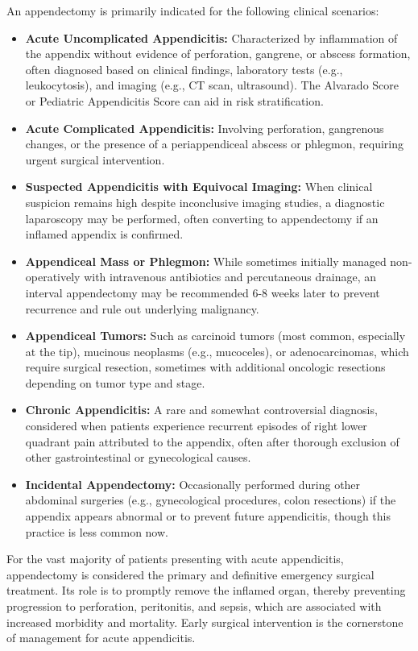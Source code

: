 An appendectomy is primarily indicated for the following clinical scenarios:
\begin{itemize}
  \item \textbf{Acute Uncomplicated Appendicitis:} Characterized by inflammation of the appendix without evidence of perforation, gangrene, or abscess formation, often diagnosed based on clinical findings, laboratory tests (e.g., leukocytosis), and imaging (e.g., CT scan, ultrasound). The Alvarado Score or Pediatric Appendicitis Score can aid in risk stratification.
  \item \textbf{Acute Complicated Appendicitis:} Involving perforation, gangrenous changes, or the presence of a periappendiceal abscess or phlegmon, requiring urgent surgical intervention.
  \item \textbf{Suspected Appendicitis with Equivocal Imaging:} When clinical suspicion remains high despite inconclusive imaging studies, a diagnostic laparoscopy may be performed, often converting to appendectomy if an inflamed appendix is confirmed.
  \item \textbf{Appendiceal Mass or Phlegmon:} While sometimes initially managed non-operatively with intravenous antibiotics and percutaneous drainage, an interval appendectomy may be recommended 6-8 weeks later to prevent recurrence and rule out underlying malignancy.
  \item \textbf{Appendiceal Tumors:} Such as carcinoid tumors (most common, especially at the tip), mucinous neoplasms (e.g., mucoceles), or adenocarcinomas, which require surgical resection, sometimes with additional oncologic resections depending on tumor type and stage.
  \item \textbf{Chronic Appendicitis:} A rare and somewhat controversial diagnosis, considered when patients experience recurrent episodes of right lower quadrant pain attributed to the appendix, often after thorough exclusion of other gastrointestinal or gynecological causes.
  \item \textbf{Incidental Appendectomy:} Occasionally performed during other abdominal surgeries (e.g., gynecological procedures, colon resections) if the appendix appears abnormal or to prevent future appendicitis, though this practice is less common now.
\end{itemize}

For the vast majority of patients presenting with acute appendicitis, appendectomy is considered the primary and definitive emergency surgical treatment. Its role is to promptly remove the inflamed organ, thereby preventing progression to perforation, peritonitis, and sepsis, which are associated with increased morbidity and mortality. Early surgical intervention is the cornerstone of management for acute appendicitis.

